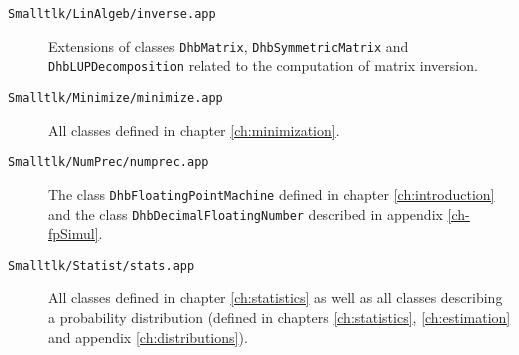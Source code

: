 \documentclass[twoside]{book}
\begin{document}
\begin{description}
  \item[\tt Smalltlk/LinAlgeb/inverse.app] Extensions of classes {\tt DhbMatrix}, {\tt DhbSymmetricMatrix} and
     {\tt DhbLUPDecomposition} related to the computation of matrix inversion.
  \item[\tt Smalltlk/Minimize/minimize.app] All classes defined in chapter \ref{ch:minimization}.
  \item[\tt Smalltlk/NumPrec/numprec.app] The class {\tt DhbFloatingPointMachine} defined in
  chapter \ref{ch:introduction} and the class {\tt DhbDecimalFloatingNumber} described in appendix \ref{ch-fpSimul}.
  \item[\tt Smalltlk/Statist/stats.app] All classes defined in chapter \ref{ch:statistics} as well as all
  classes describing a probability distribution (defined in chapters \ref{ch:statistics},
  \ref{ch:estimation} and appendix \ref{ch:distributions}).
\end{description}
\end{document}
